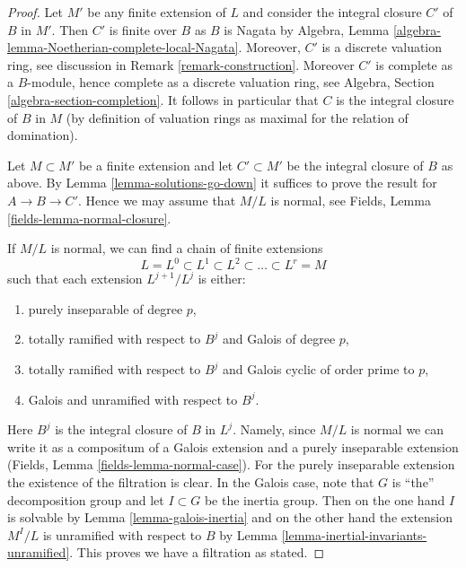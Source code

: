 \documentclass[10pt,a4paper]{amsart}
\theoremstyle{plain}
\theoremstyle{definition}
\theoremstyle{remark}
\numberwithin{equation}{subsection}
\begin{document}
\begin{proof}
Let $M'$ be any finite extension of $L$ and consider the integral closure
$C'$ of $B$ in $M'$. Then $C'$ is finite over $B$ as $B$ is Nagata by
Algebra, Lemma \ref{algebra-lemma-Noetherian-complete-local-Nagata}.
Moreover, $C'$ is a discrete valuation ring, see discussion in
Remark \ref{remark-construction}. Moreover $C'$ is complete as a
$B$-module, hence complete as a discrete valuation ring, see
Algebra, Section \ref{algebra-section-completion}.
It follows in particular that $C$ is the integral
closure of $B$ in $M$ (by definition of valuation rings as maximal
for the relation of domination).

\medskip\noindent
Let $M \subset M'$ be a finite extension and let $C' \subset M'$
be the integral closure of $B$ as above. By
Lemma \ref{lemma-solutions-go-down}
it suffices to prove the result for $A \to B \to C'$.
Hence we may assume that $M/L$ is normal, see
Fields, Lemma \ref{fields-lemma-normal-closure}.

\medskip\noindent
If $M / L$ is normal, we can find a chain of finite extensions
$$
L = L^0 \subset L^1 \subset L^2 \subset \ldots \subset L^r = M
$$
such that each extension $L^{j + 1}/L^j$ is either:
\begin{enumerate}
\item[(a)] purely inseparable of degree $p$,
\item[(b)] totally ramified with respect to $B^j$ and Galois of degree $p$,
\item[(c)] totally ramified with respect to $B^j$ and Galois cyclic of
order prime to $p$,
\item[(d)] Galois and unramified with respect to $B^j$.
\end{enumerate}
Here $B^j$ is the integral closure of $B$ in $L^j$.
Namely, since $M/L$ is normal we can write it as a compositum of
a Galois extension and a purely inseparable extension
(Fields, Lemma \ref{fields-lemma-normal-case}).
For the purely inseparable extension the existence of the filtration
is clear. In the Galois case, note that $G$ is ``the'' decomposition group
and let $I \subset G$ be the inertia group. Then on the one hand
$I$ is solvable by Lemma \ref{lemma-galois-inertia} and on the other
hand the extension $M^I/L$ is unramified with respect to $B$ by
Lemma \ref{lemma-inertial-invariants-unramified}.
This proves we have a filtration as stated.


\end{proof}
\end{document}
